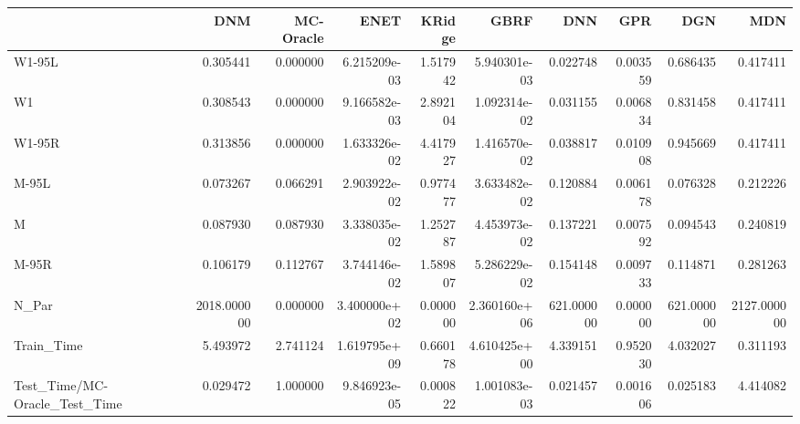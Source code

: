 \begin{tabular}{lrrrrrrrrr}
\toprule
{} &          DNM &  MC-Oracle &          ENET &    KRidge &          GBRF &         DNN &       GPR &         DGN &          MDN \\
\midrule
W1-95L                        &     0.305441 &   0.000000 &  6.215209e-03 &  1.517942 &  5.940301e-03 &    0.022748 &  0.003559 &    0.686435 &     0.417411 \\
W1                            &     0.308543 &   0.000000 &  9.166582e-03 &  2.892104 &  1.092314e-02 &    0.031155 &  0.006834 &    0.831458 &     0.417411 \\
W1-95R                        &     0.313856 &   0.000000 &  1.633326e-02 &  4.417927 &  1.416570e-02 &    0.038817 &  0.010908 &    0.945669 &     0.417411 \\
M-95L                         &     0.073267 &   0.066291 &  2.903922e-02 &  0.977477 &  3.633482e-02 &    0.120884 &  0.006178 &    0.076328 &     0.212226 \\
M                             &     0.087930 &   0.087930 &  3.338035e-02 &  1.252787 &  4.453973e-02 &    0.137221 &  0.007592 &    0.094543 &     0.240819 \\
M-95R                         &     0.106179 &   0.112767 &  3.744146e-02 &  1.589807 &  5.286229e-02 &    0.154148 &  0.009733 &    0.114871 &     0.281263 \\
N\_Par                         &  2018.000000 &   0.000000 &  3.400000e+02 &  0.000000 &  2.360160e+06 &  621.000000 &  0.000000 &  621.000000 &  2127.000000 \\
Train\_Time                    &     5.493972 &   2.741124 &  1.619795e+09 &  0.660178 &  4.610425e+00 &    4.339151 &  0.952030 &    4.032027 &     0.311193 \\
Test\_Time/MC-Oracle\_Test\_Time &     0.029472 &   1.000000 &  9.846923e-05 &  0.000822 &  1.001083e-03 &    0.021457 &  0.001606 &    0.025183 &     4.414082 \\
\bottomrule
\end{tabular}
